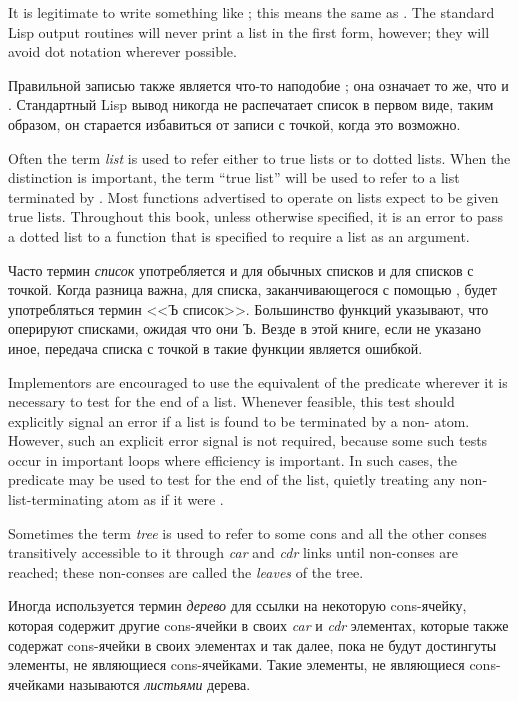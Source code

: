 It is legitimate to write something like ;
this means the same as .  The standard Lisp
output routines will never print a list in the first form, however;
they will avoid dot notation wherever possible.

Правильной записью также является что-то наподобие ;
она означает то же, что и . Стандартный Lisp вывод никогда не
распечатает список в первом виде, таким образом, он старается избавиться от
записи с точкой, когда это возможно.

Often the term \emph{list} is used to refer either to true lists or to
dotted lists.  When the distinction is important,
the term ``true list'' will be used to refer to a list
terminated by {\nil}.  Most functions
advertised to operate on lists expect to be given true lists. Throughout
this book, unless otherwise specified, it is an error to pass a dotted
list to a function that is specified to require a list as an argument.

Часто термин \emph{список} употребляется и для обычных списков и для списков с
точкой. Когда разница важна, для списка, заканчивающегося с помощью {\nil},
будет употребляться термин <<Ъ список>>. Большинство функций указывают, что
оперируют списками, ожидая что они Ъ. Везде в этой книге, если не указано иное,
передача списка с точкой в такие функции является ошибкой.

\beforenoterule
\begin{implementation}
Implementors are encouraged to use the equivalent
of the predicate  wherever it is necessary to test
for the end of a list.  Whenever feasible, this test should explicitly
signal an error if a list is found to be terminated by a non-{\nil} atom.
However, such an explicit error signal is not required, because
some such tests occur in important loops where efficiency is important.
In such cases, the predicate  may be used to test
for the end of the list, quietly treating any non-{\nil} list-terminating
atom as if it were {\nil}.
\end{implementation}
\afternoterule

Sometimes the term \emph{tree} is used to refer to some cons
and all the other conses transitively accessible to it
through \emph{car} and \emph{cdr} links until non-conses are reached;
these non-conses are called the \emph{leaves} of the tree.

Иногда используется термин \emph{дерево} для ссылки на некоторую cons-ячейку,
которая содержит другие cons-ячейки в своих \emph{car} и \emph{cdr} элементах,
которые также содержат cons-ячейки в своих элементах и так далее, пока не будут
достингуты элементы, не являющиеся cons-ячейками.
Такие элементы, не являющиеся cons-ячейками называются \emph{листьями} дерева.

